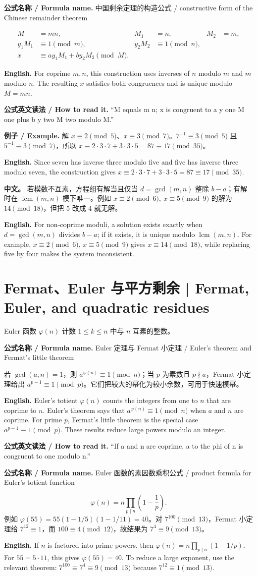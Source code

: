 \documentclass[UTF8,11pt,a4paper]{ctexart}
\newcommand{\EN}[1]{\par\noindent \textbf{English.} #1\par}
\newcommand{\BOTH}[2]{\par\noindent\textbf{中文。} #1\par\noindent\textbf{English.} #2\par}
\newcommand{\FORMULA}[2]{\par\noindent\textbf{公式名称 / Formula name.} #1 / #2\par}
\newcommand{\READ}[1]{\par\noindent \textbf{公式英文读法 / How to read it.} #1\par}
\newcommand{\EX}[2]{\par\noindent \textbf{例子 / Example.} #1\par\EN{#2}}
\begin{document}
\FORMULA{中国剩余定理的构造公式}{constructive form of the Chinese remainder theorem}
\[
\begin{aligned}
M&=mn,& M_1&=n,& M_2&=m,\\
y_1M_1&\equiv1\pmod m,& y_2M_2&\equiv1\pmod n,\\
x&\equiv ay_1M_1+by_2M_2\pmod M.
\end{aligned}
\]
\EN{For coprime $m,n$, this construction uses inverses of $n$ modulo $m$ and $m$ modulo $n$. The resulting $x$ satisfies both congruences and is unique modulo $M=mn$.}
\READ{“M equals m n; x is congruent to a y one M one plus b y two M two modulo M.”}
\EX{解 $x\equiv2\pmod5$、$x\equiv3\pmod7$。$7^{-1}\equiv3\pmod5$ 且 $5^{-1}\equiv3\pmod7$，所以 $x\equiv2\cdot3\cdot7+3\cdot3\cdot5=87\equiv17\pmod{35}$。}{Since seven has inverse three modulo five and five has inverse three modulo seven, the construction gives $x\equiv2\cdot3\cdot7+3\cdot3\cdot5=87\equiv17\pmod{35}$.}
\BOTH{若模数不互素，方程组有解当且仅当 $d=\gcd(m,n)$ 整除 $b-a$；有解时在 $\operatorname{lcm}(m,n)$ 模下唯一。例如 $x\equiv2\pmod6,\ x\equiv5\pmod9$ 的解为 $14\pmod{18}$，但把 $5$ 改成 $4$ 就无解。}{For non-coprime moduli, a solution exists exactly when $d=\gcd(m,n)$ divides $b-a$; if it exists, it is unique modulo $\operatorname{lcm}(m,n)$. For example, $x\equiv2\pmod6$, $x\equiv5\pmod9$ gives $x\equiv14\pmod{18}$, while replacing five by four makes the system inconsistent.}

\section{Fermat、Euler 与平方剩余 | Fermat, Euler, and quadratic residues}
\noindent Euler 函数 $\varphi(n)$ 计数 $1\le k\le n$ 中与 $n$ 互素的整数。\FORMULA{Euler 定理与 Fermat 小定理}{Euler's theorem and Fermat's little theorem} 若 $\gcd(a,n)=1$，则 $a^{\varphi(n)}\equiv1\pmod n$；当 $p$ 为素数且 $p\nmid a$，Fermat 小定理给出 $a^{p-1}\equiv1\pmod p$。它们把较大的幂化为较小余数，可用于快速模幂。
\EN{Euler's totient $\varphi(n)$ counts the integers from one to $n$ that are coprime to $n$. Euler's theorem says that $a^{\varphi(n)}\equiv1\pmod n$ when $a$ and $n$ are coprime. For prime $p$, Fermat's little theorem is the special case $a^{p-1}\equiv1\pmod p$. These results reduce large powers modulo an integer.}
\READ{“If a and n are coprime, a to the phi of n is congruent to one modulo n.”}
\FORMULA{Euler 函数的素因数乘积公式}{product formula for Euler's totient function}
\[
\varphi(n)=n\prod_{p\mid n}\left(1-\frac1p\right).
\]
\noindent 例如 $\varphi(55)=55(1-1/5)(1-1/11)=40$。对 $7^{100}\pmod{13}$，Fermat 小定理给 $7^{12}\equiv1$，而 $100\equiv4\pmod{12}$，故结果为 $7^4\equiv9\pmod{13}$。
\EN{If $n$ is factored into prime powers, then $\varphi(n)=n\prod_{p\mid n}(1-1/p)$. For $55=5\cdot11$, this gives $\varphi(55)=40$. To reduce a large exponent, use the relevant theorem: $7^{100}\equiv7^4\equiv9\pmod{13}$ because $7^{12}\equiv1\pmod{13}$.}
\end{document}
